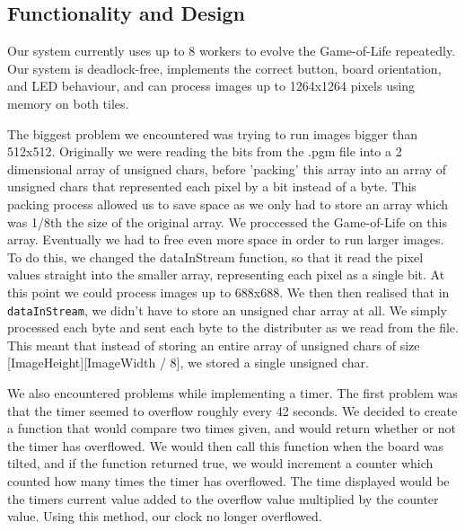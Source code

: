\documentclass{article}
\begin{document}
\begin{multicols}{2}

\section{Functionality and Design}
Our system currently uses up to 8 workers to evolve the Game-of-Life repeatedly. Our system is 
deadlock-free, implements the correct button, board orientation, and LED behaviour, and can process 
images up to 1264x1264 pixels using memory on both tiles.

\vspace{5mm}

The biggest problem we encountered was trying to run images bigger than 512x512. Originally we were 
reading the bits from the .pgm file into a 2 dimensional array of unsigned chars, before 'packing' 
this array into an array of unsigned chars that represented each pixel by a bit instead of a byte. 
This packing process allowed us to save space as we only had to store an array which was 1/8th the 
size of the original array. We proccessed the Game-of-Life on this array. Eventually we had to 
free even more space in order to run larger images. To do this, we changed the dataInStream function, 
so that it read the pixel values straight into the smaller array, representing each pixel as a 
single bit. At this point we could process images up to 688x688. We then then realised that in
\texttt{dataInStream}, we didn't have to store an unsigned char array at all. We simply processed 
each byte and sent each byte to the distributer as we read from the file. This meant that instead 
of storing an entire array of unsigned chars of size [ImageHeight][ImageWidth / 8], we stored a single 
unsigned char.

\vspace{5mm}

We also encountered problems while implementing a timer. The first problem was that the timer seemed 
to overflow roughly every 42 seconds. We decided to create a function that would compare two times 
given, and would return whether or not the timer has overflowed. We would then call this function when 
the board was tilted, and if the function returned true, we would increment a counter which counted 
how many times the timer has overflowed. The time displayed would be the timers current value added 
to the overflow value multiplied by the counter value. Using this method, our clock no longer 
overflowed.


\end{multicols}
\end{document}

